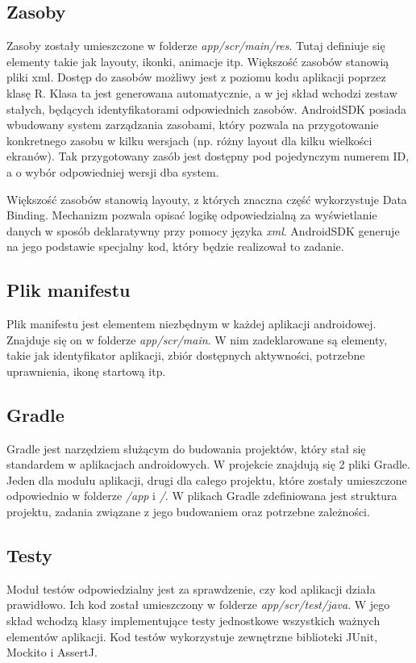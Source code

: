 \documentclass[openright]{xmgr}
\begin{document}
\subsection*{Zasoby}
Zasoby zostały umieszczone w folderze \textit{app/scr/main/res}. Tutaj definiuje się elementy takie jak layouty, ikonki, animacje itp. Większość zasobów stanowią pliki xml. Dostęp do zasobów możliwy jest z poziomu kodu aplikacji poprzez klasę R. Klasa ta jest generowana automatycznie, a w jej skład wchodzi zestaw stałych, będących identyfikatorami odpowiednich zasobów. AndroidSDK posiada wbudowany system zarządzania zasobami, który pozwala na przygotowanie konkretnego zasobu w kilku wersjach (np. różny layout dla kilku wielkości ekranów). Tak przygotowany zasób jest dostępny pod pojedynczym numerem ID, a o wybór odpowiedniej wersji dba system.

Większość zasobów stanowią layouty, z których znaczna część wykorzystuje Data Binding. Mechanizm pozwala opisać logikę odpowiedzialną za wyświetlanie danych w sposób deklaratywny przy pomocy języka \textit{xml}. AndroidSDK generuje na jego podstawie specjalny kod, który będzie realizował to zadanie. 

\subsection*{Plik manifestu}
Plik manifestu jest elementem niezbędnym w każdej aplikacji androidowej. Znajduje się on w folderze \textit{app/scr/main}. W nim zadeklarowane są elementy, takie jak identyfikator aplikacji, zbiór dostępnych aktywności, potrzebne uprawnienia, ikonę startową itp.

\subsection*{Gradle}
Gradle jest narzędziem służącym do budowania projektów, który stał się standardem w aplikacjach androidowych. W projekcie znajdują się 2 pliki Gradle. Jeden dla modułu aplikacji, drugi dla całego projektu, które zostały umieszczone odpowiednio w folderze \textit{/app} i \textit{/}. W plikach Gradle zdefiniowana jest struktura projektu, zadania związane z jego budowaniem oraz potrzebne zależności.

\subsection*{Testy}
Moduł testów odpowiedzialny jest za sprawdzenie, czy kod aplikacji działa prawidłowo. Ich  kod został umieszczony w folderze \textit{app/scr/test/java}. W jego skład wchodzą klasy implementujące testy jednostkowe wszystkich ważnych elementów aplikacji. Kod testów wykorzystuje zewnętrzne biblioteki JUnit, Mockito i AssertJ.
\end{document}
